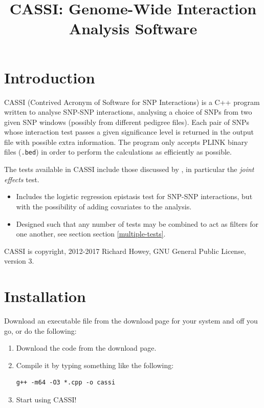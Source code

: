\documentclass[a4paper,12pt]{article}
\newcommand{\code}[1]{{\footnotesize{{\tt #1}}}}
\begin{document}
\title{CASSI: Genome-Wide Interaction Analysis Software}
\date{}
\author{}
\maketitle
\newpage
\tableofcontents
\newpage
\section{Introduction}
\label{introduction}

CASSI (Contrived Acronym of Software for SNP Interactions) is a C++ program written to analyse SNP-SNP interactions, analysing a choice of SNPs from two given SNP windows (possibly from different pedigree files). Each pair of SNPs whose interaction test passes a given significance level is returned in the output file with possible extra information. The program only accepts PLINK binary files (\code{.bed}) in order to perform the calculations as efficiently as possible. 

The tests available in CASSI include those discussed by \citet{ueki:etal:12}, in particular the {\it joint effects} test. 
\begin{itemize}

\item Includes the logistic regression epistasis test for SNP-SNP interactions, but with the possibility of adding covariates to the analysis. 
\item Designed such that any number of tests may be combined to act as filters for one another, see section  section \ref{multiple-tests}. \end{itemize}

CASSI is copyright, 2012-2017 Richard Howey, GNU General Public License, version 3. 


\section{Installation}
\label{installation}

Download an executable file from the download$\:$page for your system and off you go, or do the following: 
\begin{enumerate}

\item Download the code from the download page. 
\item Compile it by typing something like the following: \vspace{0.35cm} \begin{lstlisting}
g++ -m64 -O3 *.cpp -o cassi

\end{lstlisting} \vspace{0.35cm}
\item Start using CASSI!\end{enumerate}
\end{document}
